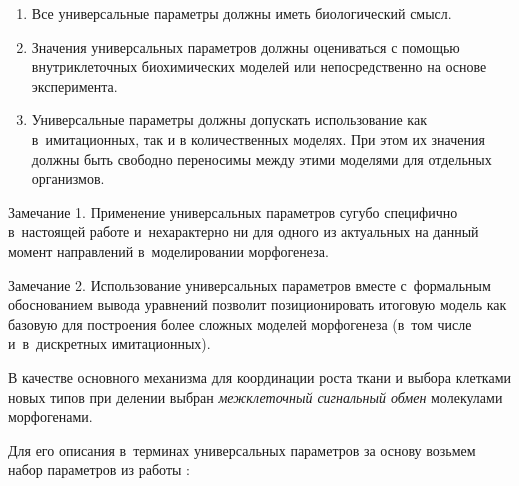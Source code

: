 \begin{enumerate}

\item[1.] Все универсальные параметры должны иметь биологический смысл.

\item[2.] Значения универсальных параметров должны оцениваться с помощью внутриклеточных биохимических моделей или непосредственно на основе эксперимента.

\item[3.] Универсальные параметры должны допускать использование как в~имитационных, так и в количественных моделях. При этом их значения должны быть свободно переносимы между этими моделями для отдельных организмов. 

\end{enumerate}



\smallskip



{\small\sc Замечание 1.} Применение универсальных параметров сугубо специфично в~настоящей работе и~нехарактерно ни для одного из  актуальных на данный момент направлений в~моделировании морфогенеза. 



\smallskip



{\small\sc Замечание 2.} Использование универсальных параметров вместе с~формальным обоснованием вывода уравнений позволит позиционировать итоговую модель как базовую для построения более сложных моделей морфогенеза (в~том числе и~в~дискретных имитационных).

 



\smallskip 

 

В качестве основного механизма для координации роста ткани и выбора клетками новых типов при делении выбран \textit{межклеточный сигнальный обмен} молекулами морфогенами. 

Для его описания в~терминах универсальных параметров за основу  возьмем набор параметров из работы \cite{Nazarov:bib:Nazarov2013}:

